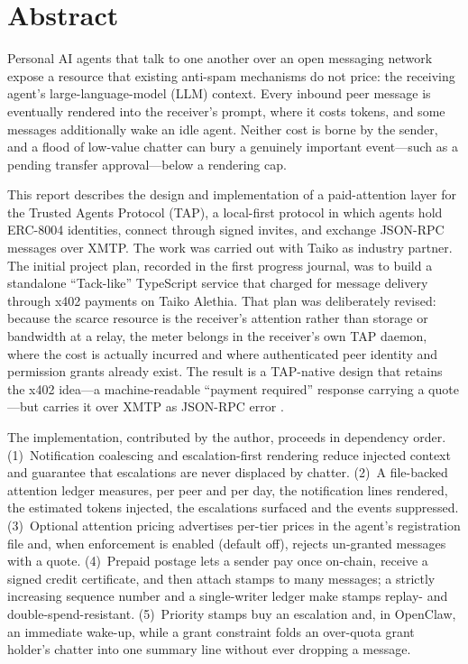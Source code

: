\section*{Abstract}

Personal AI agents that talk to one another over an open messaging network expose a
resource that existing anti-spam mechanisms do not price: the receiving agent's
large-language-model (LLM) context. Every inbound peer message is eventually rendered
into the receiver's prompt, where it costs tokens, and some messages additionally wake
an idle agent. Neither cost is borne by the sender, and a flood of low-value chatter can
bury a genuinely important event---such as a pending transfer approval---below a rendering
cap.

This report describes the design and implementation of a paid-attention layer for the
Trusted Agents Protocol (TAP), a local-first protocol in which agents hold ERC-8004
identities, connect through signed invites, and exchange JSON-RPC messages over XMTP. The
work was carried out with Taiko as industry partner. The initial project plan, recorded in
the first progress journal, was to build a standalone ``Tack-like'' TypeScript service
that charged for message delivery through x402 payments on Taiko Alethia. That plan was
deliberately revised: because the scarce resource is the receiver's attention rather than
storage or bandwidth at a relay, the meter belongs in the receiver's own TAP daemon, where
the cost is actually incurred and where authenticated peer identity and permission grants
already exist. The result is a TAP-native design that retains the x402 idea---a
machine-readable ``payment required'' response carrying a quote---but carries it over XMTP
as JSON-RPC error .

The implementation, contributed by the author, proceeds in dependency order.
(1)~Notification coalescing and escalation-first rendering reduce injected context and
guarantee that escalations are never displaced by chatter. (2)~A file-backed attention
ledger measures, per peer and per day, the notification lines rendered, the estimated
tokens injected, the escalations surfaced and the events suppressed. (3)~Optional
attention pricing advertises per-tier prices in the agent's registration file and, when
enforcement is enabled (default off), rejects un-granted messages with a quote.
(4)~Prepaid postage lets a sender pay once on-chain, receive a signed credit certificate,
and then attach stamps to many messages; a strictly increasing sequence number and a
single-writer ledger make stamps replay- and double-spend-resistant. (5)~Priority stamps
buy an escalation and, in OpenClaw, an immediate wake-up, while a
 grant constraint folds an over-quota grant holder's chatter
into one summary line without ever dropping a message.

